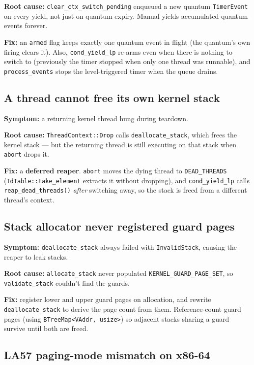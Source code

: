 \textbf{Root cause:} \texttt{clear\_ctx\_switch\_pending} enqueued a new
quantum \texttt{TimerEvent} on every yield, not just on quantum expiry. Manual
yields accumulated quantum events forever.

\textbf{Fix:} an \texttt{armed} flag keeps exactly one quantum event in flight
(the quantum's own firing clears it). Also, \texttt{cond\_yield\_lp} re-arms even
when there is nothing to switch to (previously the timer stopped when only one
thread was runnable), and \texttt{process\_events} stops the level-triggered
timer when the queue drains.

\subsection{A thread cannot free its own kernel stack}

\textbf{Symptom:} a returning kernel thread hung during teardown.

\textbf{Root cause:} \texttt{ThreadContext::Drop} calls
\texttt{deallocate\_stack}, which frees the kernel stack --- but the returning
thread is still executing on that stack when \texttt{abort} drops it.

\textbf{Fix:} a \textbf{deferred reaper}. \texttt{abort} moves the dying thread
to \texttt{DEAD\_THREADS} (\texttt{IdTable::take\_element} extracts it without
dropping), and \texttt{cond\_yield\_lp} calls \texttt{reap\_dead\_threads()}
\emph{after} switching away, so the stack is freed from a different thread's
context.

\subsection{Stack allocator never registered guard pages}

\textbf{Symptom:} \texttt{deallocate\_stack} always failed with
\texttt{InvalidStack}, causing the reaper to leak stacks.

\textbf{Root cause:} \texttt{allocate\_stack} never populated
\texttt{KERNEL\_GUARD\_PAGE\_SET}, so \texttt{validate\_stack} couldn't find
the guards.

\textbf{Fix:} register lower and upper guard pages on allocation, and rewrite
\texttt{deallocate\_stack} to derive the page count from them. Reference-count
guard pages (using \texttt{BTreeMap<VAddr, usize>}) so adjacent stacks sharing
a guard survive until both are freed.

\subsection{LA57 paging-mode mismatch on x86-64}

